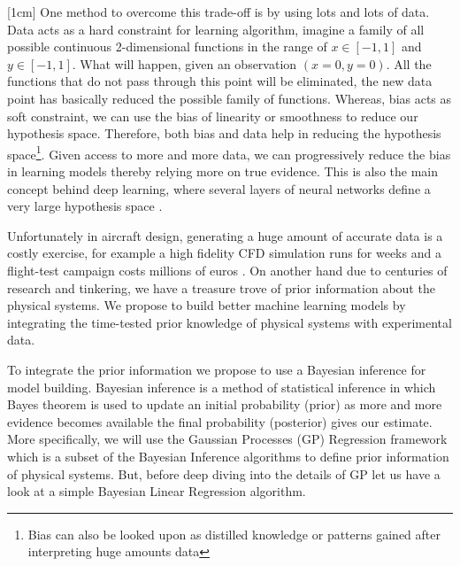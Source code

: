 [1cm]
One method to overcome this trade-off is by using lots and lots of data. Data acts as a hard constraint for learning algorithm, imagine a family of all possible continuous 2-dimensional functions in the range of $x \in [-1, 1]$ and $y \in [-1, 1]$. What will happen, given an observation $(x = 0, y = 0)$. All the functions that do not pass through this point will be eliminated, the new data point has basically reduced the possible family of functions. Whereas, bias acts as soft constraint, we can use the bias of linearity or smoothness to reduce our hypothesis space. Therefore, both bias and data help in reducing the hypothesis space\footnote{Bias can also be looked upon as distilled knowledge or patterns gained after interpreting huge amounts data}. Given access to more and more data, we can progressively reduce the bias in learning models thereby relying more on true evidence. This is also the main concept behind deep learning, where several layers of neural networks define a very large hypothesis space \cite{Goodfellow-et-al-2016, lecun2015deep}. 

Unfortunately in aircraft design, generating a huge amount of accurate data is a costly exercise, for example a high fidelity CFD simulation runs for weeks \cite{murthy2014computational, jameson2012computational, forrester2008engineering} and a flight-test campaign costs millions of euros \cite{fox2004test}. On another hand due to centuries of research and tinkering, we have a treasure trove of prior information about the physical systems. We propose to build better machine learning models by integrating the time-tested prior knowledge of physical systems with experimental data. 

To integrate the prior information we propose to use a Bayesian inference for model building. Bayesian inference is a method of statistical inference in which Bayes theorem is used to update an initial probability (prior) as more and more evidence becomes available the final probability (posterior) gives our estimate. More specifically, we will use the Gaussian Processes (GP) Regression framework which is a subset of the Bayesian Inference algorithms to define prior information of physical systems. But, before deep diving into the details of GP let us have a look at a simple Bayesian Linear Regression algorithm.

